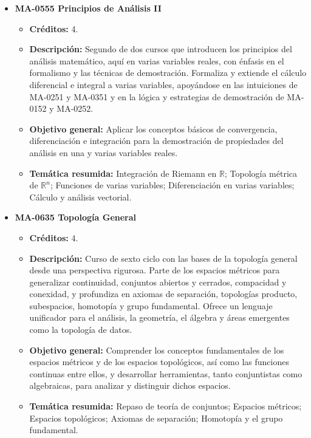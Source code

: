 \begin{itemize}[leftmargin=1.3em, itemsep=10pt, topsep=4pt, label={\color{Azul-UCR}$\blacksquare$}]
\item {\color{Azul-UCR}\textbf{MA-0555 Principios de Análisis II}}\par\nopagebreak\smallskip
\begin{itemize}[leftmargin=1.1em, itemsep=3pt, topsep=2pt, parsep=2pt, label={\textendash}]
\item \textbf{Créditos:} 4.
\item \textbf{Descripción:} Segundo de dos cursos que introducen los principios del análisis matemático, aquí en varias variables reales, con énfasis en el formalismo y las técnicas de demostración. Formaliza y extiende el cálculo diferencial e integral a varias variables, apoyándose en las intuiciones de MA-0251 y MA-0351 y en la lógica y estrategias de demostración de MA-0152 y MA-0252.
\item \textbf{Objetivo general:} Aplicar los conceptos básicos de convergencia, diferenciación e integración para la demostración de propiedades del análisis en una y varias variables reales.
\item \textbf{Temática resumida:} Integración de Riemann en $\mathbb{R}$; Topología métrica de $\mathbb{R}^n$; Funciones de varias variables; Diferenciación en varias variables; Cálculo y análisis vectorial.
\end{itemize}

\item {\color{Azul-UCR}\textbf{MA-0635 Topología General}}\par\nopagebreak\smallskip
\begin{itemize}[leftmargin=1.1em, itemsep=3pt, topsep=2pt, parsep=2pt, label={\textendash}]
\item \textbf{Créditos:} 4.
\item \textbf{Descripción:} Curso de sexto ciclo con las bases de la topología general desde una perspectiva rigurosa. Parte de los espacios métricos para generalizar continuidad, conjuntos abiertos y cerrados, compacidad y conexidad, y profundiza en axiomas de separación, topologías producto, subespacios, homotopía y grupo fundamental. Ofrece un lenguaje unificador para el análisis, la geometría, el álgebra y áreas emergentes como la topología de datos.
\item \textbf{Objetivo general:} Comprender los conceptos fundamentales de los espacios métricos y de los espacios topológicos, así como las funciones continuas entre ellos, y desarrollar herramientas, tanto conjuntistas como algebraicas, para analizar y distinguir dichos espacios.
\item \textbf{Temática resumida:} Repaso de teoría de conjuntos; Espacios métricos; Espacios topológicos; Axiomas de separación; Homotopía y el grupo fundamental.
\end{itemize}


\end{itemize}
